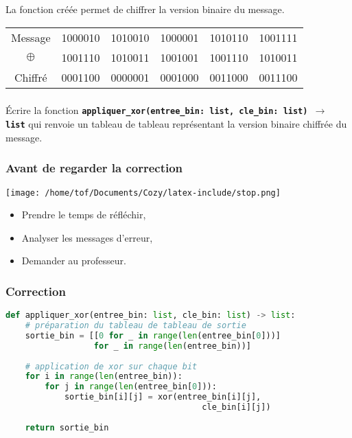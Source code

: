 \documentclass[svgnames,11pt]{beamer}
\begin{document}
\begin{frame}
    \frametitle{}

    La fonction créée permet de chiffrer la version binaire du message.
    \begin{center}
        \begin{tabular}{*{6}{c}}
            Message&1000010&1010010&1000001&1010110&1001111\\
            $\oplus$&1001110&1010011&1001001&1001110&1010011\\
            \hline
            Chiffré&0001100&0000001&0001000&0011000&0011100\\
        \end{tabular}
    \end{center}

\end{frame}
\begin{frame}
    \frametitle{}

    \begin{activite}
    Écrire la fonction \textbf{\texttt{appliquer\_xor(entree\_bin: list, cle\_bin: list) $\rightarrow$ list}} qui renvoie un tableau de tableau représentant la version binaire chiffrée du message.
    \end{activite}

\end{frame}
\begin{frame}
    \frametitle{Avant de regarder la correction}
\begin{center}
    \centering
    \texttt{[image: /home/tof/Documents/Cozy/latex-include/stop.png]}
    \end{center}
{\Large
    \begin{itemize}
        \item Prendre le temps de réfléchir,
        \item Analyser les messages d'erreur,
        \item Demander au professeur.
    \end{itemize}
}
\end{frame}
\begin{frame}[fragile]
    \frametitle{Correction}

\begin{center}
\begin{lstlisting}[language=Python , basicstyle=\ttfamily\small, xleftmargin=0.2em, xrightmargin=-4em]
def appliquer_xor(entree_bin: list, cle_bin: list) -> list:
    # préparation du tableau de tableau de sortie
    sortie_bin = [[0 for _ in range(len(entree_bin[0]))]
                  for _ in range(len(entree_bin))]
    
    # application de xor sur chaque bit
    for i in range(len(entree_bin)):
        for j in range(len(entree_bin[0])):
            sortie_bin[i][j] = xor(entree_bin[i][j], 
                                        cle_bin[i][j])
    
    return sortie_bin
\end{lstlisting}
\end{center}

\end{frame}
\end{document}
